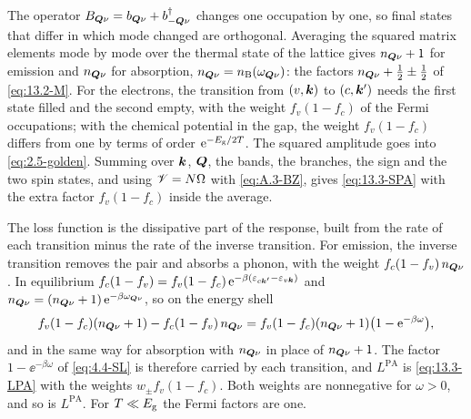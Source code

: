 The operator $B_{\bm{Q}\nu} = b_{\bm{Q}\nu} + b^\dagger_{-\bm{Q}\nu}$ changes one occupation by one, so final states that differ in which mode changed are orthogonal. Averaging the squared matrix elements mode by mode over the thermal state of the lattice gives $n_{\bm{Q}\nu} + 1$ for emission and $n_{\bm{Q}\nu}$ for absorption, $n_{\bm{Q}\nu} = n_{\mathrm{B}}(\omega_{\bm{Q}\nu})$: the factors $n_{\bm{Q}\nu} + \frac12 \pm \frac12$ of \cref{eq:13.2-M}. For the electrons, the transition from $(v,\bm{k})$ to $(c,\bm{k}')$ needs the first state filled and the second empty, with the weight $f_v(1 - f_c)$ of the Fermi occupations; with the chemical potential in the gap, the weight $f_v(1 - f_c)$ differs from one by terms of order $\mathrm{e}^{-E_{\mathrm{g}}/2T}$. The squared amplitude goes into \cref{eq:2.5-golden}. Summing over $\bm{k}$, $\bm{Q}$, the bands, the branches, the sign and the two spin states, and using $\mathscr{V} = N\Omega$ with \cref{eq:A.3-BZ}, gives \cref{eq:13.3-SPA} with the extra factor $f_v(1 - f_c)$ inside the average.

The loss function is the dissipative part of the response, built from the rate of each transition minus the rate of the inverse transition. For emission, the inverse transition removes the pair and absorbs a phonon, with the weight $f_c(1 - f_v)\,n_{\bm{Q}\nu}$. In equilibrium $f_c(1 - f_v) = f_v(1 - f_c)\,\mathrm{e}^{-\beta(\varepsilon_{c\bm{k}'} - \varepsilon_{v\bm{k}})}$ and $n_{\bm{Q}\nu} = (n_{\bm{Q}\nu} + 1)\,\mathrm{e}^{-\beta\omega_{\bm{Q}\nu}}$, so on the energy shell
\begin{equation*}
  f_v(1 - f_c)(n_{\bm{Q}\nu} + 1) - f_c(1 - f_v)\,n_{\bm{Q}\nu} = f_v(1 - f_c)(n_{\bm{Q}\nu} + 1)\bigl(1 - \mathrm{e}^{-\beta\omega}\bigr) ,
\end{equation*}
and in the same way for absorption with $n_{\bm{Q}\nu}$ in place of $n_{\bm{Q}\nu} + 1$. The factor $1 - \ee^{-\beta\omega}$ of \cref{eq:4.4-SL} is therefore carried by each transition, and $L^{\mathrm{PA}}$ is \cref{eq:13.3-LPA} with the weights $w_\pm f_v(1 - f_c)$. Both weights are nonnegative for $\omega > 0$, and so is $L^{\mathrm{PA}}$. For $T \ll E_{\mathrm{g}}$ the Fermi factors are one.
